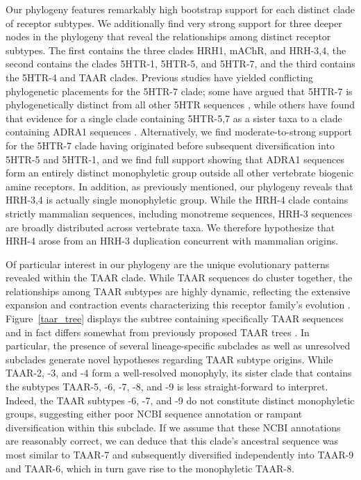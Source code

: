 \documentclass[fleqn,10pt]{wlpeerj}
\begin{document}
Our phylogeny features remarkably high bootstrap support for each distinct clade of receptor subtypes. We additionally find very strong support for three deeper nodes in the phylogeny that reveal the relationships among distinct receptor subtypes. The first contains the three clades HRH1, mAChR, and HRH-3,4, the second contains the clades 5HTR-1, 5HTR-5, and 5HTR-7, and the third contains the 5HTR-4 and TAAR clades. Previous studies have yielded conflicting phylogenetic placements for the 5HTR-7 clade; some have argued that 5HTR-7 is phylogenetically distinct from all other 5HTR sequences \citep{KakaralaJamil2014}, while others have found that evidence for a single clade containing 5HTR-5,7 as a sister taxa to a clade containing ADRA1 sequences \citep{Fredrikssonetal2003}. Alternatively, we find moderate-to-strong support for the 5HTR-7 clade having originated before subsequent diversification into 5HTR-5 and 5HTR-1, and we find full support showing that ADRA1 sequences form an entirely distinct monophyletic group outside all other vertebrate biogenic amine receptors. In addition, as previously mentioned, our phylogeny reveals that HRH-3,4 is actually single monophyletic group. While the HRH-4 clade contains strictly mammalian sequences, including monotreme sequences, HRH-3 sequences are broadly distributed across vertebrate taxa. We therefore hypothesize that HRH-4 arose from an HRH-3 duplication concurrent with mammalian origins.

Of particular interest in our phylogeny are the unique evolutionary patterns revealed within the TAAR clade. While TAAR sequences do cluster together, the relationships among TAAR subtypes are highly dynamic, reflecting the extensive expansion and contraction events characterizing this receptor family's evolution \citep{Lindemann2005,Hashiguchi2007,Staubert2010,Staubert2013}. Figure~\ref{taar_tree} displays the subtree containing specifically TAAR sequences and in fact differs somewhat from previously proposed TAAR trees \citep{Lindemann2005, Hashiguchi2007}. In particular, the presence of several lineage-specific subclades as well as unresolved subclades generate novel hypotheses regarding TAAR subtype origins. While TAAR-2, -3, and -4 form a well-resolved monophyly, its sister clade that contains the subtypes TAAR-5, -6, -7, -8, and -9 is less straight-forward to interpret. Indeed, the TAAR subtypes -6, -7, and -9 do not constitute distinct monophyletic groups, suggesting either poor NCBI sequence annotation or rampant diversification within this subclade. If we assume that these NCBI annotations are reasonably correct, we can deduce that this clade's ancestral sequence was most similar to TAAR-7 and subsequently diversified independently into TAAR-9 and TAAR-6, which in turn gave rise to the monophyletic TAAR-8. 
\end{document}
